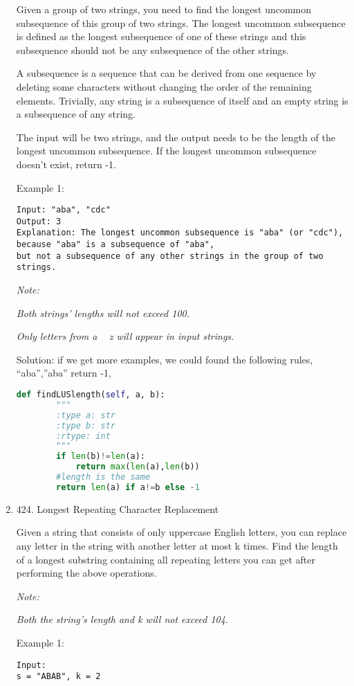 \documentclass[../main.tex]{subfiles}
\begin{document}
\begin{enumerate}
Given a group of two strings, you need to find the longest uncommon subsequence of this group of two strings. The longest uncommon subsequence is defined as the longest subsequence of one of these strings and this subsequence should not be any subsequence of the other strings.

A subsequence is a sequence that can be derived from one sequence by deleting some characters without changing the order of the remaining elements. Trivially, any string is a subsequence of itself and an empty string is a subsequence of any string.

The input will be two strings, and the output needs to be the length of the longest uncommon subsequence. If the longest uncommon subsequence doesn’t exist, return -1.

Example 1:
\begin{lstlisting}
Input: "aba", "cdc"
Output: 3
Explanation: The longest uncommon subsequence is "aba" (or "cdc"), 
because "aba" is a subsequence of "aba", 
but not a subsequence of any other strings in the group of two strings.
\end{lstlisting}

\textit{Note:}

    \textit{Both strings’ lengths will not exceed 100.}
    
    \textit{Only letters from a ~ z will appear in input strings.}

Solution: if we get more examples, we could found the following rules, “aba”,”aba” return -1,
\begin{lstlisting}[language = Python]
def findLUSlength(self, a, b):
        """
        :type a: str
        :type b: str
        :rtype: int
        """
        if len(b)!=len(a):
            return max(len(a),len(b))
        #length is the same
        return len(a) if a!=b else -1
\end{lstlisting}
\item 424. Longest Repeating Character Replacement

Given a string that consists of only uppercase English letters, you can replace any letter in the string with another letter at most k times. Find the length of a longest substring containing all repeating letters you can get after performing the above operations.

\textit{Note:}

 \textit{Both the string’s length and k will not exceed 104.}

Example 1:
\begin{lstlisting}
Input:
s = "ABAB", k = 2


\end{lstlisting}
\end{enumerate}
\end{document}
